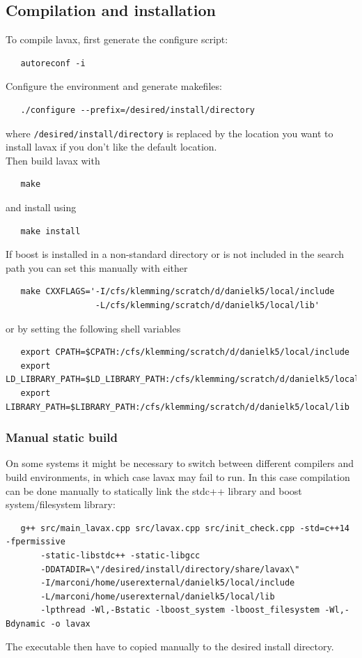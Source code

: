 \documentclass{article}
\begin{document}
\subsection{Compilation and installation}
To compile lavax, first generate the configure script:
\begin{verbatim}
   autoreconf -i 
\end{verbatim}
Configure the environment and generate makefiles:
\begin{verbatim}
   ./configure --prefix=/desired/install/directory
\end{verbatim}
where \texttt{/desired/install/directory} is replaced by the location you want to install lavax if you don't like the default location.
\newline \\
Then build lavax with
\begin{verbatim}
   make
\end{verbatim}
and install using
\begin{verbatim}
   make install
\end{verbatim}
If boost is installed in a non-standard directory or is not included in the search path you can set this manually with either
\begin{verbatim}
   make CXXFLAGS='-I/cfs/klemming/scratch/d/danielk5/local/include
                  -L/cfs/klemming/scratch/d/danielk5/local/lib'
\end{verbatim}
or by setting the following shell variables
\begin{verbatim}
   export CPATH=$CPATH:/cfs/klemming/scratch/d/danielk5/local/include
   export LD_LIBRARY_PATH=$LD_LIBRARY_PATH:/cfs/klemming/scratch/d/danielk5/local/lib
   export LIBRARY_PATH=$LIBRARY_PATH:/cfs/klemming/scratch/d/danielk5/local/lib
\end{verbatim}

\subsubsection{Manual static build}
On some systems it might be necessary to switch between different compilers and build environments, in which case lavax may fail to run. In this case compilation can be done manually to statically link the stdc++ library and boost system/filesystem library:
\begin{verbatim}
   g++ src/main_lavax.cpp src/lavax.cpp src/init_check.cpp -std=c++14 -fpermissive
       -static-libstdc++ -static-libgcc
       -DDATADIR=\"/desired/install/directory/share/lavax\"
       -I/marconi/home/userexternal/danielk5/local/include
       -L/marconi/home/userexternal/danielk5/local/lib
       -lpthread -Wl,-Bstatic -lboost_system -lboost_filesystem -Wl,-Bdynamic -o lavax
\end{verbatim}
The executable then have to copied manually to the desired install directory.      
\end{document}
